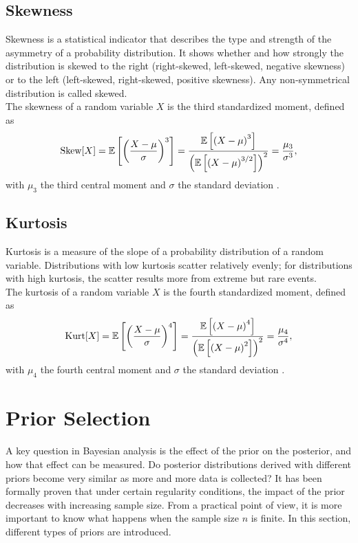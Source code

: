 \subsection{Skewness}
Skewness is a statistical indicator that describes the type and strength of the asymmetry of a probability distribution. It shows whether and how strongly the distribution is skewed to the right (right-skewed, left-skewed, negative skewness) or to the left (left-skewed, right-skewed, positive skewness). Any non-symmetrical distribution is called skewed. \\
The skewness of a random variable $X$ is the third standardized moment, defined as
\begin{equation}\label{eq:skewness}
    \hbox{Skew}[X]=\mathbb{E}\left[\left(\frac{X-\mu}{\sigma}\right)^3\right] = \frac{\mathbb{E}\left[\left(X-\mu\right)^3\right]}{\left(\mathbb{E}\left[\left(X-\mu\right)^{3/2}\right]\right)^2}=\frac{\mu_3}{\sigma^3},
\end{equation}
with $\mu_3$ the third central moment and $\sigma$ the standard deviation \autocite[][]{doane2011measuring, wilkins1944note}.
\subsection{Kurtosis}
Kurtosis is a measure of the slope of a probability distribution of a random variable. Distributions with low kurtosis scatter relatively evenly; for distributions with high kurtosis, the scatter results more from extreme but rare events. \\
The kurtosis of a random variable $X$ is the fourth standardized moment, defined as
\begin{equation}\label{eq:kurtosis}
    \hbox{Kurt}[X]=\mathbb{E}\left[\left(\frac{X-\mu}{\sigma}\right)^4\right] = \frac{\mathbb{E}\left[\left(X-\mu\right)^4\right]}{\left(\mathbb{E}\left[\left(X-\mu\right)^2\right]\right)^2}=\frac{\mu_4}{\sigma^4},
\end{equation}
with $\mu_4$ the fourth central moment and $\sigma$ the standard deviation \autocite[][]{decarlo1997meaning, wilkins1944note}.
\clearpage
\section{Prior Selection}
A key question in Bayesian analysis is the effect of the prior on the posterior, and how that effect can be measured. Do posterior distributions derived with different priors become very similar as more and more data is collected? It has been formally proven that under certain regularity conditions, the impact of the prior decreases with increasing sample size. From a practical point of view, it is more important to know what happens when the sample size $n$ is finite. In this section, different types of priors are introduced.
